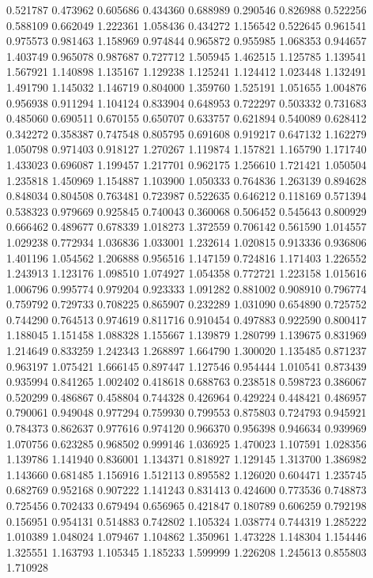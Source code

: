 0.521787
0.473962
0.605686
0.434360
0.688989
0.290546
0.826988
0.522256
0.588109
0.662049
1.222361
1.058436
0.434272
1.156542
0.522645
0.961541
0.975573
0.981463
1.158969
0.974844
0.965872
0.955985
1.068353
0.944657
1.403749
0.965078
0.987687
0.727712
1.505945
1.462515
1.125785
1.139541
1.567921
1.140898
1.135167
1.129238
1.125241
1.124412
1.023448
1.132491
1.491790
1.145032
1.146719
0.804000
1.359760
1.525191
1.051655
1.004876
0.956938
0.911294
1.104124
0.833904
0.648953
0.722297
0.503332
0.731683
0.485060
0.690511
0.670155
0.650707
0.633757
0.621894
0.540089
0.628412
0.342272
0.358387
0.747548
0.805795
0.691608
0.919217
0.647132
1.162279
1.050798
0.971403
0.918127
1.270267
1.119874
1.157821
1.165790
1.171740
1.433023
0.696087
1.199457
1.217701
0.962175
1.256610
1.721421
1.050504
1.235818
1.450969
1.154887
1.103900
1.050333
0.764836
1.263139
0.894628
0.848034
0.804508
0.763481
0.723987
0.522635
0.646212
0.118169
0.571394
0.538323
0.979669
0.925845
0.740043
0.360068
0.506452
0.545643
0.800929
0.666462
0.489677
0.678339
1.018273
1.372559
0.706142
0.561590
1.014557
1.029238
0.772934
1.036836
1.033001
1.232614
1.020815
0.913336
0.936806
1.401196
1.054562
1.206888
0.956516
1.147159
0.724816
1.171403
1.226552
1.243913
1.123176
1.098510
1.074927
1.054358
0.772721
1.223158
1.015616
1.006796
0.995774
0.979204
0.923333
1.091282
0.881002
0.908910
0.796774
0.759792
0.729733
0.708225
0.865907
0.232289
1.031090
0.654890
0.725752
0.744290
0.764513
0.974619
0.811716
0.910454
0.497883
0.922590
0.800417
1.188045
1.151458
1.088328
1.155667
1.139879
1.280799
1.139675
0.831969
1.214649
0.833259
1.242343
1.268897
1.664790
1.300020
1.135485
0.871237
0.963197
1.075421
1.666145
0.897447
1.127546
0.954444
1.010541
0.873439
0.935994
0.841265
1.002402
0.418618
0.688763
0.238518
0.598723
0.386067
0.520299
0.486867
0.458804
0.744328
0.426964
0.429224
0.448421
0.486957
0.790061
0.949048
0.977294
0.759930
0.799553
0.875803
0.724793
0.945921
0.784373
0.862637
0.977616
0.974120
0.966370
0.956398
0.946634
0.939969
1.070756
0.623285
0.968502
0.999146
1.036925
1.470023
1.107591
1.028356
1.139786
1.141940
0.836001
1.134371
0.818927
1.129145
1.313700
1.386982
1.143660
0.681485
1.156916
1.512113
0.895582
1.126020
0.604471
1.235745
0.682769
0.952168
0.907222
1.141243
0.831413
0.424600
0.773536
0.748873
0.725456
0.702433
0.679494
0.656965
0.421847
0.180789
0.606259
0.792198
0.156951
0.954131
0.514883
0.742802
1.105324
1.038774
0.744319
1.285222
1.010389
1.048024
1.079467
1.104862
1.350961
1.473228
1.148304
1.154446
1.325551
1.163793
1.105345
1.185233
1.599999
1.226208
1.245613
0.855803
1.710928
